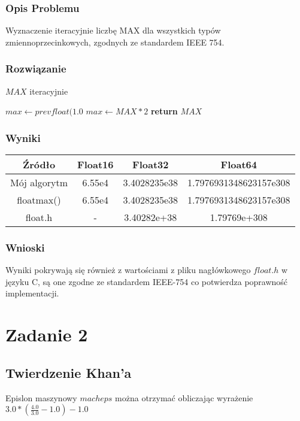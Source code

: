 \documentclass{article}
\begin{document}
\subsubsection{Opis Problemu}
    Wyznaczenie iteracyjnie liczbę MAX dla wszystkich typów zmiennoprzecinkowych, zgodnych ze standardem IEEE 754.
\subsubsection{Rozwiązanie}
    \begin{algorithm}
    \caption{$MAX$ iteracyjnie}\label{alg:cap}
    \begin{algorithmic}
        \State $max \gets prevfloat(1.0$
            \State $max \gets MAX * 2$
        \EndWhile
        \State \textbf{return} $MAX$
    \end{algorithmic}
    \end{algorithm}
\subsubsection{Wyniki}
    \begin{center}
        \begin{tabular}{|c||c|c|c|}
        \hline
            Źródło & Float16 & Float32 & Float64\\
            \hline\hline
            Mój algorytm & 6.55e4 & 3.4028235e38 & 1.7976931348623157e308\\
            \hline
            floatmax() & 6.55e4 & 3.4028235e38 & 1.7976931348623157e308\\
            \hline
            float.h & - & 3.40282e+38 & 1.79769e+308\\
        \hline
        \end{tabular}
    \end{center}
\subsubsection{Wnioski}
    Wyniki pokrywają się również z wartościami z pliku nagłówkowego $float.h$ w języku C, są one zgodne ze standardem IEEE-754 co potwierdza poprawność implementacji.

\section{Zadanie 2}
\subsection{Twierdzenie Khan'a}
	Epislon maszynowy $macheps$ można otrzymać obliczając wyrażenie $3.0*(\frac{4.0}{3.0} - 1.0) - 1.0$
\end{document}
